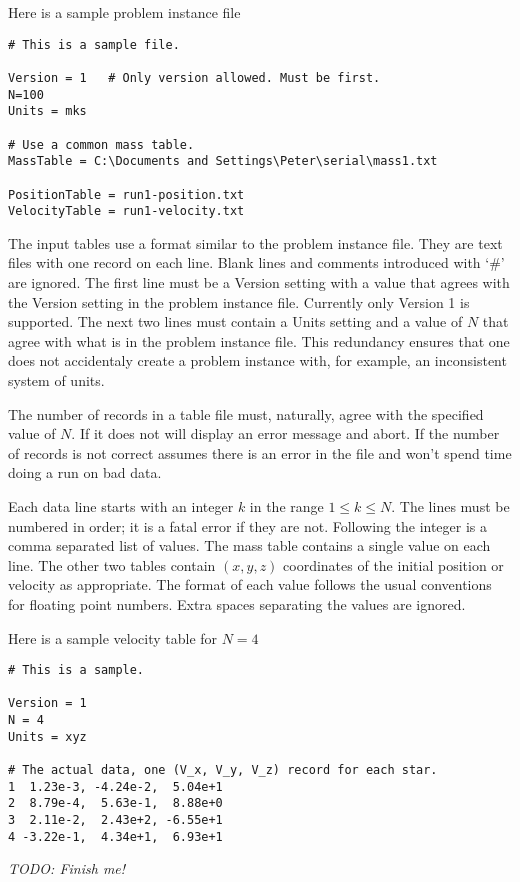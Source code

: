 Here is a sample problem instance file
\begin{verbatim}
# This is a sample file.

Version = 1   # Only version allowed. Must be first.
N=100
Units = mks

# Use a common mass table.
MassTable = C:\Documents and Settings\Peter\serial\mass1.txt

PositionTable = run1-position.txt
VelocityTable = run1-velocity.txt
\end{verbatim}

The input tables use a format similar to the problem instance file. They are text files with one
record on each line. Blank lines and comments introduced with `\#' are ignored. The first line
must be a Version setting with a value that agrees with the Version setting in the problem
instance file. Currently only Version 1 is supported. The next two lines must contain a Units
setting and a value of $N$ that agree with what is in the problem instance file. This redundancy
ensures that one does not accidentaly create a problem instance with, for example, an
inconsistent system of units.

The number of records in a table file must, naturally, agree with the specified value of $N$. If
it does not  will display an error message and abort. If the number of records
is not correct  assumes there is an error in the file and won't spend time
doing a run on bad data.

Each data line starts with an integer $k$ in the range $1 \le k \le N$. The lines must be
numbered in order; it is a fatal error if they are not. Following the integer is a comma
separated list of values. The mass table contains a single value on each line. The other two
tables contain $(x, y, z)$ coordinates of the initial position or velocity as appropriate. The
format of each value follows the usual conventions for floating point numbers. Extra spaces
separating the values are ignored.

Here is a sample velocity table for $N=4$
\begin{verbatim}
# This is a sample.

Version = 1
N = 4
Units = xyz

# The actual data, one (V_x, V_y, V_z) record for each star.
1  1.23e-3, -4.24e-2,  5.04e+1
2  8.79e-4,  5.63e-1,  8.88e+0
3  2.11e-2,  2.43e+2, -6.55e+1
4 -3.22e-1,  4.34e+1,  6.93e+1
\end{verbatim}

\textit{TODO: Finish me!}
